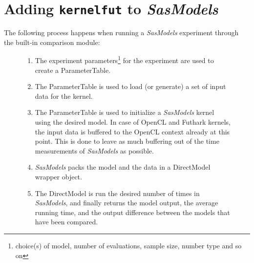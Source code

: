 \documentclass[11pt]{article}
\newcommand{\sasmodels}{\textit{SasModels}}
\begin{document}
\section{Adding \texttt{kernelfut} to \sasmodels}
The following process happens when running a \sasmodels{} experiment through the
built-in comparison module:
\begin{figure}
  
\begin{enumerate}
  \item The experiment parameters\footnote{choice(s) of model, number of 
  evaluations, sample size, number type and so on} for the experiment are used
  to create a ParameterTable.
  
  \item The ParameterTable is used to load (or generate) a set of input data for
   the kernel.

  \item The ParameterTable is used to initialize a \sasmodels{} kernel using the
  desired model. In case of OpenCL and Futhark kernels, the input data is 
  buffered to the OpenCL context already at this point. This is done to leave
  as much buffering out of the time measurements of \sasmodels{} as possible.
  
  \item \sasmodels{} packs the model and the data in a DirectModel wrapper object.

  \item The DirectModel is run the desired number of times in \sasmodels,
  and finally returns the model output, the average running time, and the
  output difference between the models that have been compared. 
\end{enumerate}
\end{figure}
\end{document}
